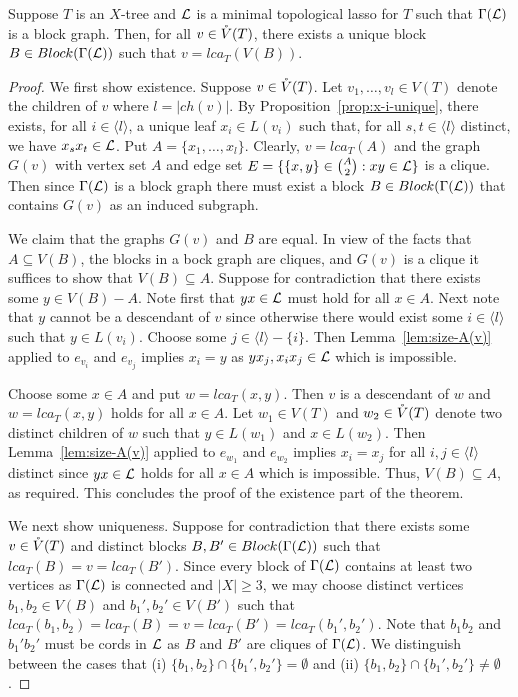 \begin{thm}\label{theo:unique-block}
  Suppose $T$ is an $X$-tree and ${\mathcal L}$ is a minimal topological lasso for $T$
  such that $\Gamma({\mathcal L})$ is a block graph. Then, for all $v\in \mathring{V}(T)$, there
  exists a unique block $B\in Block(\Gamma({\mathcal L}))$ such that $v=lca_T(V(B))$.
\end{thm}
\begin{proof}
  We first show existence. Suppose $v\in \mathring{V}(T)$. Let $v_1,\ldots,v_l\in V(T)$
  denote the children of $v$ where $l=|ch(v)|$.  By
  Proposition~\ref{prop:x-i-unique}, there exists, for all $i\in\langle
  l\rangle$, a unique leaf $x_i\in L(v_i)$ such that, for all $s,t\in \langle
  l\rangle$ distinct, we have $x_sx_t\in {\mathcal L}$. Put $A=\{x_1,\ldots,x_l\}$.
  Clearly, $v=lca_T(A)$ and the graph $G(v)$ with vertex set $A$ and edge set
  $E=\{\{x,y\}\in {A\choose 2}: xy\in{\mathcal L}\}$ is a clique.  Then since
  $\Gamma({\mathcal L})$ is a block graph there must exist a block $B\in
  Block(\Gamma({\mathcal L}))$ that contains $G(v)$ as an induced subgraph.

  We claim that the graphs $G(v)$ and $B$ are equal.  In view of the facts
  that $A\subseteq V(B)$, the blocks in a bock graph are cliques, and $G(v)$
  is a clique it suffices to show that $V(B)\subseteq A$. Suppose for
  contradiction that there exists some $y\in V(B)-A$. Note first that $yx\in
  {\mathcal L}$ must hold for all $x\in A$.  Next note that $y$ cannot be a descendant
  of $v$ since otherwise there would exist some $i\in\langle l\rangle$ such
  that $y\in L(v_i)$. Choose some $j\in \langle l\rangle-\{i\}$. Then
  Lemma~\ref{lem:size-A(v)} applied to $e_{v_i}$ and $e_{v_j}$ implies $x_i=y$
  as $yx_j,x_ix_j\in{\mathcal L}$ which is impossible.

  Choose some $x\in A$ and put $w=lca_T(x,y)$. Then $v$ is a descendant of $w$
  and $w=lca_T(x,y)$ holds for all $x\in A$. Let $w_1\in V(T)$ and $w_2\in
  \mathring{V}(T)$ denote two distinct children of $w$ such that $y\in L(w_1)$ and
  $x\in L(w_2)$. Then Lemma~\ref{lem:size-A(v)} applied to $e_{w_1}$ and
  $e_{w_2}$ implies $x_i=x_j$ for all $i,j\in\langle l\rangle$ distinct since
  $yx\in{\mathcal L}$ holds for all $x\in A$ which is impossible.  Thus, $V(B)\subseteq
  A$, as required. This concludes the proof of the existence part of the
  theorem.

  We next show uniqueness.  Suppose for contradiction that there exists some
  $v\in \mathring{V}(T)$ and distinct blocks $B,B'\in Block(\Gamma({\mathcal L}))$ such that
  $lca_T(B)=v=lca_T(B')$.  Since every block of $\Gamma({\mathcal L})$ contains at
  least two vertices as $\Gamma({\mathcal L})$ is connected and $|X|\geq 3$, we may
  choose distinct vertices $b_1,b_2\in V(B)$ and $b_1',b_2'\in V(B')$ such
  that $lca_T(b_1,b_2)=lca_T(B)=v=lca_T(B')=lca_T(b_1',b_2')$.  Note that
  $b_1b_2$ and $b_1'b_2' $ must be cords in ${\mathcal L}$ as $B$ and $B'$ are cliques
  of $\Gamma({\mathcal L})$.  We distinguish between the cases that (i)
  $\{b_1,b_2\}\cap\{b_1',b_2'\}=\emptyset $ and (ii)
  $\{b_1,b_2\}\cap\{b_1',b_2'\}\not=\emptyset $.


\end{proof}

